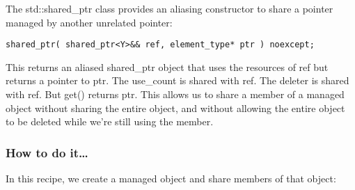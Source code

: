 
The std::shared\_ptr class provides an aliasing constructor to share a pointer managed by another unrelated pointer:

\begin{lstlisting}[style=styleCXX]
shared_ptr( shared_ptr<Y>&& ref, element_type* ptr ) noexcept;
\end{lstlisting}

This returns an aliased shared\_ptr object that uses the resources of ref but returns a pointer to ptr. The use\_count is shared with ref. The deleter is shared with ref. But get() returns ptr. This allows us to share a member of a managed object without sharing the entire object, and without allowing the entire object to be deleted while we're still using the member.

\subsubsection{How to do it…}

In this recipe, we create a managed object and share members of that object:

